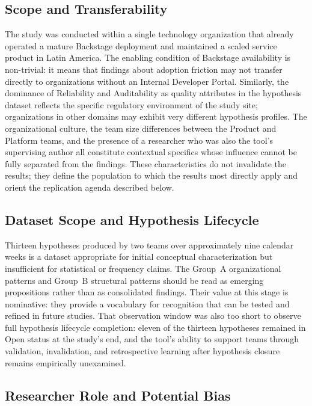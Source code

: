 \subsection{Scope and Transferability}

The study was conducted within a single technology organization that already operated
a mature Backstage deployment and maintained a scaled service product in
Latin America. The enabling condition of Backstage availability is non-trivial: it means
that findings about adoption friction may not transfer directly to organizations without an Internal
Developer Portal. Similarly, the dominance of Reliability and Auditability as quality
attributes in the hypothesis dataset reflects the specific regulatory environment of the
study site; organizations in other domains may exhibit very different hypothesis profiles.
The organizational culture, the team size differences between the Product and Platform
teams, and the presence of a researcher who was also the tool's supervising author
all constitute contextual specifics whose influence cannot be fully separated from the
findings. These characteristics do not invalidate the results; they define the population
to which the results most directly apply and orient the replication agenda described
below.

\subsection{Dataset Scope and Hypothesis Lifecycle}

Thirteen hypotheses produced by two teams over approximately nine calendar weeks is a dataset appropriate for
initial conceptual characterization but insufficient for statistical or frequency claims.
The Group~A organizational patterns and Group~B structural patterns should be read
as emerging propositions rather than as consolidated findings. Their value at
this stage is nominative: they provide a vocabulary for recognition that can be tested and
refined in future studies. That observation window was also too short to observe
full hypothesis lifecycle completion: eleven of the thirteen hypotheses remained in Open
status at the study's end, and the tool's ability to support teams through validation,
invalidation, and retrospective learning after hypothesis closure remains empirically
unexamined.

\subsection{Researcher Role and Potential Bias}

